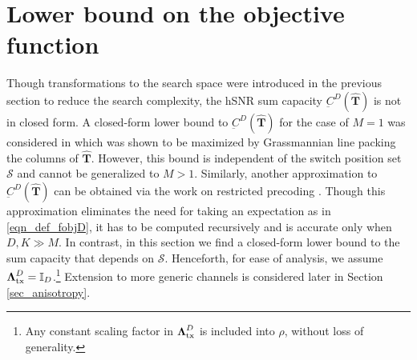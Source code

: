 \documentclass[journal,comsoc]{IEEEtran}
\begin{document}
\section{Lower bound on the objective function} \label{sec_approx_obj_fn}
Though transformations to the search space were introduced in the previous section to reduce the search complexity, the hSNR sum capacity $\underbar{C}^{D}(\hat{\mathbf{T}})$ is not in closed form. A closed-form lower bound to $\underbar{C}^{D}(\hat{\mathbf{T}})$ for the case of $M=1$ was considered in \cite{Vishnu_ICC2017} which was shown to be maximized by Grassmannian line packing the columns of $\hat{\mathbf{T}}$. However, this bound is independent of the switch position set $\mathcal{S}$ and cannot be generalized to $M > 1$. Similarly, another approximation to $\underbar{C}^{D}(\hat{\mathbf{T}})$ can be obtained via the work on restricted precoding \cite{Vishnu_jrnl1}. Though this approximation eliminates the need for taking an expectation as in \eqref{eqn_def_fobjD}, it has to be computed recursively and is accurate only when $D,K \gg M$. In contrast, in this section we find a closed-form lower bound to the sum capacity that depends on $\mathcal{S}$. Henceforth, for ease of analysis, we assume $\boldsymbol{\Lambda}_{\rm tx}^{D} = \mathbb{I}_D$.\footnote{Any constant scaling factor in $\boldsymbol{\Lambda}_{\rm tx}^{D}$ is included into $\rho$, without loss of generality.} Extension to more generic channels is considered later in Section \ref{sec_anisotropy}. 
\end{document}
